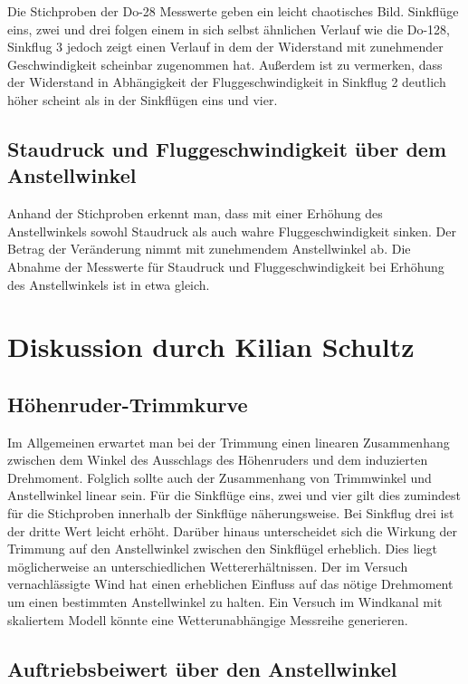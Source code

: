 \documentclass[11pt]{scrartcl}
\begin{document}
Die Stichproben der Do-28 Messwerte geben ein leicht chaotisches Bild. Sinkflüge eins, zwei und drei folgen einem in sich selbst ähnlichen Verlauf wie die Do-128, Sinkflug 3 jedoch zeigt einen Verlauf in dem der Widerstand mit zunehmender Geschwindigkeit scheinbar zugenommen hat.
Außerdem ist zu vermerken, dass der Widerstand in Abhängigkeit der Fluggeschwindigkeit in Sinkflug 2 deutlich höher scheint als in der Sinkflügen eins und vier.

	\subsection{Staudruck und Fluggeschwindigkeit über dem Anstellwinkel}
	
Anhand der Stichproben erkennt man, dass mit einer Erhöhung des Anstellwinkels sowohl Staudruck als auch wahre Fluggeschwindigkeit sinken. Der Betrag der Veränderung nimmt mit zunehmendem Anstellwinkel ab. Die Abnahme der Messwerte für Staudruck und Fluggeschwindigkeit bei Erhöhung des Anstellwinkels ist in etwa gleich.


\section{Diskussion durch Kilian Schultz}
\subsection{Höhenruder-Trimmkurve}

Im Allgemeinen erwartet man bei der Trimmung einen linearen Zusammenhang zwischen dem Winkel des Ausschlags des Höhenruders und dem induzierten Drehmoment. Folglich sollte auch der Zusammenhang von Trimmwinkel und Anstellwinkel linear sein. Für die Sinkflüge eins, zwei und vier gilt dies zumindest für die Stichproben innerhalb der Sinkflüge näherungsweise. Bei Sinkflug drei ist der dritte Wert leicht erhöht. Darüber hinaus unterscheidet sich die Wirkung der Trimmung auf den Anstellwinkel zwischen den Sinkflügel erheblich. Dies liegt möglicherweise an unterschiedlichen Wettererhältnissen. Der im Versuch vernachlässigte Wind hat einen erheblichen Einfluss auf das nötige Drehmoment um einen bestimmten Anstellwinkel zu halten.
Ein Versuch im Windkanal mit skaliertem Modell könnte eine Wetterunabhängige Messreihe generieren.

\subsection{Auftriebsbeiwert über den Anstellwinkel}
\end{document}

